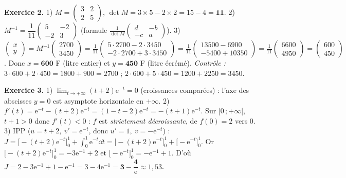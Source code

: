 \noindent\textbf{Exercice 2.}
1) $M=\begin{pmatrix}3&2\\2&5\end{pmatrix}$, $\det M=3\times5-2\times2=15-4=\mathbf{11}$.
2) $M^{-1}=\dfrac{1}{11}\begin{pmatrix}5&-2\\-2&3\end{pmatrix}$
(formule $\frac{1}{\det M}\begin{pmatrix}d&-b\\-c&a\end{pmatrix}$).
3) $\begin{pmatrix}x\\y\end{pmatrix}=M^{-1}\begin{pmatrix}2700\\3450\end{pmatrix}
=\frac{1}{11}\begin{pmatrix}5\cdot2700-2\cdot3450\\-2\cdot2700+3\cdot3450\end{pmatrix}
=\frac{1}{11}\begin{pmatrix}13500-6900\\-5400+10350\end{pmatrix}
=\frac{1}{11}\begin{pmatrix}6600\\4950\end{pmatrix}=\begin{pmatrix}600\\450\end{pmatrix}$.
Donc $x=\mathbf{600}$ F (litre entier) et $y=\mathbf{450}$ F (litre écrémé).
\emph{Contrôle :} $3\cdot600+2\cdot450=1800+900=2700$ ;
$2\cdot600+5\cdot450=1200+2250=3450$. \checkmark

\noindent\textbf{Exercice 3.}
1) $\lim_{t\to+\infty}(t+2)\mathrm e^{-t}=0$ (croissances comparées) : l'axe des abscisses
$y=0$ est asymptote horizontale en $+\infty$.
2) $f'(t)=\mathrm e^{-t}-(t+2)\mathrm e^{-t}=(1-t-2)\mathrm e^{-t}=-(t+1)\mathrm e^{-t}$.
Sur $[0\,;+\infty[$, $t+1>0$ donc $f'(t)<0$ : $f$ est \emph{strictement décroissante},
de $f(0)=2$ vers $0$.
3) IPP ($u=t+2,\ v'=\mathrm e^{-t}$, donc $u'=1,\ v=-\mathrm e^{-t}$) :
$J=\big[-(t+2)\mathrm e^{-t}\big]_0^1+\int_0^1\mathrm e^{-t}\dd t
=\big[-(t+2)\mathrm e^{-t}\big]_0^1+\big[-\mathrm e^{-t}\big]_0^1$.
Or $\big[-(t+2)\mathrm e^{-t}\big]_0^1=-3\mathrm e^{-1}+2$ et
$\big[-\mathrm e^{-t}\big]_0^1=-\mathrm e^{-1}+1$. D'où
$J=2-3\mathrm e^{-1}+1-\mathrm e^{-1}=3-4\mathrm e^{-1}=\mathbf{3-\dfrac{4}{\mathrm e}}\approx1{,}53$.

